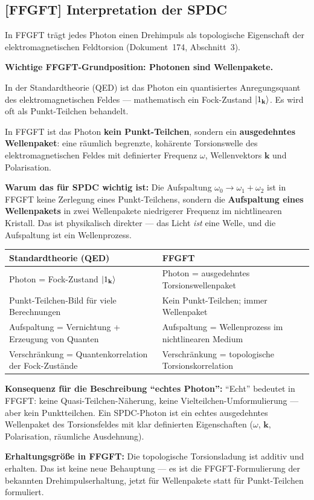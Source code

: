 \subsection{[FFGFT] Interpretation der SPDC}

\begin{foundation}
In FFGFT trägt jedes Photon einen Drehimpuls als
topologische Eigenschaft der elektromagnetischen Feldtorsion
(Dokument~174, Abschnitt~3).

\textbf{Wichtige FFGFT-Grundposition: Photonen sind Wellenpakete.}

In der Standardtheorie (QED) ist das Photon ein quantisiertes
Anregungsquant des elektromagnetischen Feldes --- mathematisch
ein Fock-Zustand $\left|1_\mathbf{k}\right\rangle$.
Es wird oft als Punkt-Teilchen behandelt.

In FFGFT ist das Photon \textbf{kein Punkt-Teilchen},
sondern ein \textbf{ausgedehntes Wellenpaket}:
eine räumlich begrenzte, kohärente Torsionswelle des
elektromagnetischen Feldes mit definierter Frequenz $\omega$,
Wellenvektors $\mathbf{k}$ und Polarisation.

\textbf{Warum das für SPDC wichtig ist:}
Die Aufspaltung $\omega_0 \to \omega_1 + \omega_2$ ist
in FFGFT keine Zerlegung eines Punkt-Teilchens,
sondern die \textbf{Aufspaltung eines Wellenpakets}
in zwei Wellenpakete niedrigerer Frequenz im nichtlinearen Kristall.
Das ist physikalisch direkter --- das Licht \emph{ist} eine Welle,
und die Aufspaltung ist ein Wellenprozess.

\begin{center}
\begin{tabular}{p{5cm}p{6cm}}
\toprule
\textbf{Standardtheorie (QED)} & \textbf{FFGFT} \\
\midrule
Photon = Fock-Zustand $\left|1_\mathbf{k}\right\rangle$ &
  Photon = ausgedehntes Torsionswellenpaket \\
Punkt-Teilchen-Bild für viele Berechnungen &
  Kein Punkt-Teilchen; immer Wellenpaket \\
Aufspaltung = Vernichtung + Erzeugung von Quanten &
  Aufspaltung = Wellenprozess im nichtlinearen Medium \\
Verschränkung = Quantenkorrelation der Fock-Zustände &
  Verschränkung = topologische Torsionskorrelation \\
\bottomrule
\end{tabular}
\end{center}

\textbf{Konsequenz für die Beschreibung ``echtes Photon'':}
``Echt'' bedeutet in FFGFT: keine Quasi-Teilchen-Näherung,
keine Vielteilchen-Umformulierung --- aber kein Punktteilchen.
Ein SPDC-Photon ist ein echtes ausgedehntes Wellenpaket
des Torsionsfeldes mit klar definierten Eigenschaften
($\omega$, $\mathbf{k}$, Polarisation, räumliche Ausdehnung).

\textbf{Erhaltungsgröße in FFGFT:}
Die topologische Torsionsladung ist additiv und erhalten.
Das ist keine neue Behauptung --- es ist die FFGFT-Formulierung
der bekannten Drehimpulserhaltung, jetzt für Wellenpakete
statt für Punkt-Teilchen formuliert.
\end{foundation}

